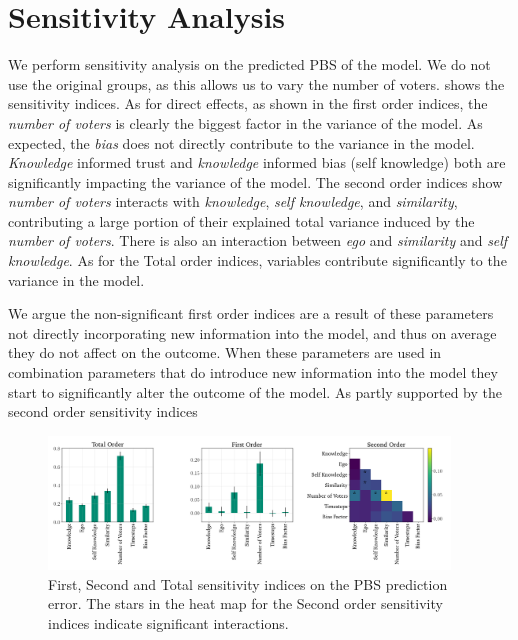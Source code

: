 \section{Sensitivity Analysis} We perform sensitivity analysis on the predicted
PBS of the model. We do not use the original groups, as this allows us to vary
the number of voters.  shows the sensitivity indices.
As for direct effects, as shown in the first order indices, the \textit{number
	of voters} is clearly the biggest factor in the variance of the model. As
expected, the \textit{bias} does not directly contribute to the variance in the
model. \textit{Knowledge} informed trust and\textit{ knowledge} informed bias
(self knowledge) both are significantly impacting the variance of the model.
The second order indices show \textit{number of voters} interacts with
\textit{knowledge}, \textit{self knowledge}, and\textit{ similarity},
contributing a large portion of their explained total variance induced by the
\textit{number of voters}. There is also an interaction between \textit{ego}
and \textit{similarity} and \textit{self knowledge}. As for the Total order
indices, variables contribute significantly to the variance in the
model.

We argue the non-significant first order indices are a result of these
parameters not directly incorporating new information into the model, and thus
on average they do not affect on the outcome. When these parameters are used in
combination parameters that do introduce new information into the model they
start to significantly alter the outcome of the model. As partly supported by
the second order sensitivity indices

\begin{figure}[ht]
	\begin{center}
		\includegraphics[width=0.95\textwidth]{Figures/senstivity_analysis.png}
	\end{center}
	\caption{First, Second and Total sensitivity indices on the PBS prediction error. The stars in the heat map for the Second order sensitivity indices indicate significant interactions. }\label{fig:sensitivty_pbs}
\end{figure}


